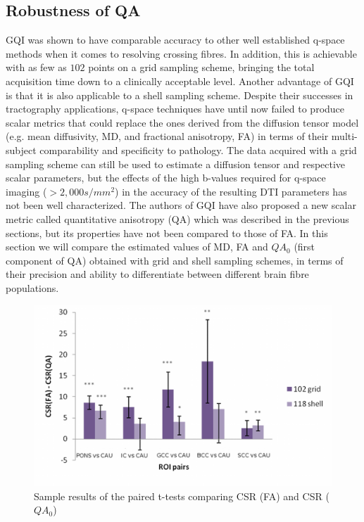 \documentclass{bioinfo}
\begin{document}
\subsection{Robustness of QA}

GQI was shown to have comparable accuracy to other well established
q-space methods when it comes to resolving crossing fibres. In addition,
this is achievable with as few as $102$ points on a grid sampling
scheme, bringing the total acquisition time down to a clinically acceptable
level. Another advantage of GQI is that it is also applicable to a
shell sampling scheme. Despite their successes in tractography applications,
q-space techniques have until now failed to produce scalar metrics
that could replace the ones derived from the diffusion tensor model
(e.g. mean diffusivity, MD, and fractional anisotropy, FA) in terms
of their multi-subject comparability and specificity to pathology.
The data acquired with a grid sampling scheme can still be used to
estimate a diffusion tensor and respective scalar parameters, but
the effects of the high b-values required for q-space imaging ($>2,000s/mm^{2}$)
in the accuracy of the resulting DTI parameters has not been well
characterized. The authors of GQI have also proposed a new scalar
metric called quantitative anisotropy (QA) which was described in
the previous sections, but its properties have not been compared to
those of FA. In this section we will compare the estimated values
of MD, FA and $QA_{0}$ (first component of QA) obtained with grid
and shell sampling schemes, in terms of their precision and ability
to differentiate between different brain fibre populations.

%
\begin{figure}
[th!]

\begin{centering}
\includegraphics[scale=1.3]{figures/MartaISMRM2}
\par\end{centering}

\caption{Sample results of the paired t-tests comparing CSR (FA) and CSR ($QA_{0}$)}


\label{Flo:CSR_t-test}
\end{figure}
\end{document}

